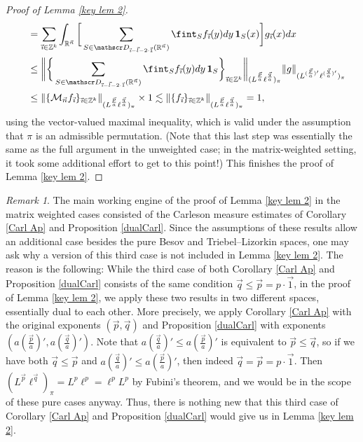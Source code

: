 \documentclass[11pt, reqno]{amsart}
\theoremstyle{definition}
\theoremstyle{remark}
\newtheorem{remark}[theorem]{Remark}
\numberwithin{equation}{section}
\newcommand{\D}{\mathscr D}
\newcommand{\R}{\mathbb R}
\newcommand{\Z}{\mathbb Z}
\newcommand{\vone}{\vec 1}
\newcommand{\vi}{\vec{\textit{\i}}}
\newcommand{\vn}{\vec n}
\newcommand{\vl}{\vec l}
\newcommand{\vp}{\vec p}
\newcommand{\vq}{\vec q}
\newcommand{\one}{\mathbf{1}}
\newcommand{\Norm}[2]{\|#1\|_{#2}}
\newcommand{\bbNorm}[2]{\bigg\|#1\bigg\|_{#2}}
\begin{document}
\begin{proof}[Proof of Lemma \ref{key lem 2}]
\begin{align*}
&\quad=\sum_{\vi\in\Z^k}\int_{\R^{\vn}}\bigg[\sum_{S\in\D_{\vi-\vl-2\cdot\vone}(\R^{\vn})} \fint_S f_{\vi}(y)dy\, \one_S(x)\bigg]g_{\vi}(x)dx \\
&\quad\leq\bbNorm{\bigg\{
\sum_{S\in\D_{\vi-\vl-2\cdot\vone}(\R^{\vn})} \fint_S f_{\vi}(y)dy\, \one_S\bigg\}_{\vi\in\Z^k} }{
(L^{\frac{\vp}{a}}\ell^{\frac{\vq}{a}})_\pi}
\Norm{g}{(L^{(\frac{\vp}{a})'}\ell^{(\frac{\vq}{a})'})_\pi}  \\
&\quad\leq\Norm{\{\mathcal M_{\vn}f_{\vi}\}_{\vi\in\Z^k}}{ (L^{\frac{\vp}{a}}\ell^{\frac{\vq}{a}})_\pi}\times 1
\lesssim \Norm{\{f_{\vi}\}_{\vi\in\Z^k}}{ (L^{\frac{\vp}{a}}\ell^{\frac{\vq}{a}})_\pi}=1,
\end{align*}
using the vector-valued maximal inequality, which is valid under the assumption that $\pi$ is an admissible permutation. (Note that this last step was essentially the same as the full argument in the unweighted case; in the matrix-weighted setting, it took some additional effort to get to this point!)
This finishes the proof of Lemma \ref{key lem 2}.
\end{proof}

\begin{remark}
The main working engine of the proof of Lemma \ref{key lem 2} in the matrix weighted cases consisted of the Carleson measure estimates of Corollary \ref{Carl Ap} and Proposition \ref{dualCarl}. Since the assumptions of these results allow an additional case besides the pure Besov and Triebel--Lizorkin spaces, one may ask why a version of this third case is not included in Lemma \ref{key lem 2}. The reason is the following: While the third case of both Corollary \ref{Carl Ap} and Proposition \ref{dualCarl} consists of the same condition $\vq\leq\vp=p\cdot\vone$, in the proof of Lemma \ref{key lem 2}, we apply these two results in two different spaces, essentially dual to each other. More precisely, we apply Corollary \ref{Carl Ap} with the original exponents $(\vp,\vq)$ and Proposition \ref{dualCarl} with exponents $(a(\frac{\vp}{a})',a(\frac{\vq}{a})')$.
Note that $a(\frac{\vq}{a})'\leq a(\frac{\vp}{a})'$ is equivalent to $\vp\leq\vq$, so if we have both $\vq\leq\vp$ and $a(\frac{\vq}{a})'\leq a(\frac{\vp}{a})'$, then indeed $\vq=\vp=p\cdot\vone$. Then $(L^{\vp}\ell^{\vq})_\pi=L^p\ell^p=\ell^pL^p$ by Fubini's theorem, and we would be in the scope of these pure cases anyway. Thus, there is nothing new that this third case of Corollary \ref{Carl Ap} and Proposition \ref{dualCarl} would give us in Lemma \ref{key lem 2}.
\end{remark}
\end{document}
